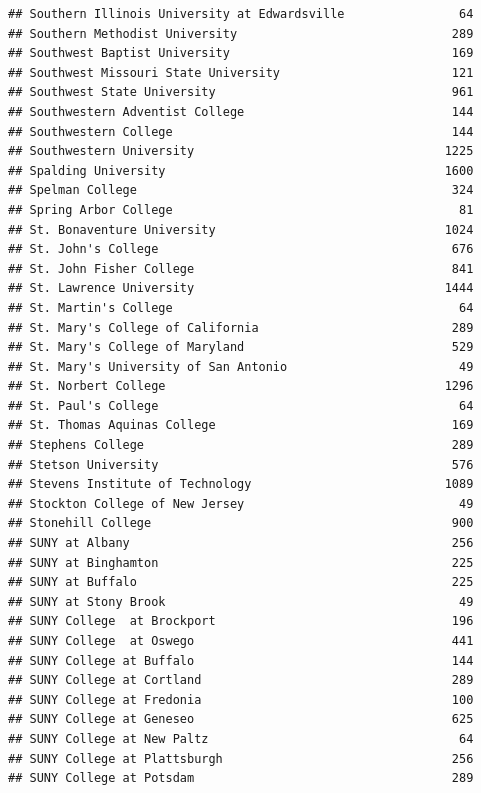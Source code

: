 \documentclass[
]{article}
\begin{document}
\begin{verbatim}
## Southern Illinois University at Edwardsville                64
## Southern Methodist University                              289
## Southwest Baptist University                               169
## Southwest Missouri State University                        121
## Southwest State University                                 961
## Southwestern Adventist College                             144
## Southwestern College                                       144
## Southwestern University                                   1225
## Spalding University                                       1600
## Spelman College                                            324
## Spring Arbor College                                        81
## St. Bonaventure University                                1024
## St. John's College                                         676
## St. John Fisher College                                    841
## St. Lawrence University                                   1444
## St. Martin's College                                        64
## St. Mary's College of California                           289
## St. Mary's College of Maryland                             529
## St. Mary's University of San Antonio                        49
## St. Norbert College                                       1296
## St. Paul's College                                          64
## St. Thomas Aquinas College                                 169
## Stephens College                                           289
## Stetson University                                         576
## Stevens Institute of Technology                           1089
## Stockton College of New Jersey                              49
## Stonehill College                                          900
## SUNY at Albany                                             256
## SUNY at Binghamton                                         225
## SUNY at Buffalo                                            225
## SUNY at Stony Brook                                         49
## SUNY College  at Brockport                                 196
## SUNY College  at Oswego                                    441
## SUNY College at Buffalo                                    144
## SUNY College at Cortland                                   289
## SUNY College at Fredonia                                   100
## SUNY College at Geneseo                                    625
## SUNY College at New Paltz                                   64
## SUNY College at Plattsburgh                                256
## SUNY College at Potsdam                                    289

\end{verbatim}
\end{document}
